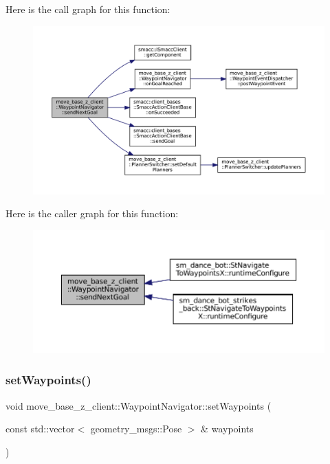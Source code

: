 Here is the call graph for this function\+:
\nopagebreak
\begin{figure}[H]
\begin{center}
\leavevmode
\includegraphics[width=350pt]{classmove__base__z__client_1_1WaypointNavigator_a376c1b5f822325122d29ad4f6e568b08_cgraph}
\end{center}
\end{figure}
Here is the caller graph for this function\+:
\nopagebreak
\begin{figure}[H]
\begin{center}
\leavevmode
\includegraphics[width=350pt]{classmove__base__z__client_1_1WaypointNavigator_a376c1b5f822325122d29ad4f6e568b08_icgraph}
\end{center}
\end{figure}
\mbox{\label{classmove__base__z__client_1_1WaypointNavigator_a2414712bd721461c810eb8908f57eef7}} 
\subsubsection{\texorpdfstring{set\+Waypoints()}{setWaypoints()}\hspace{0.1cm}{\footnotesize\ttfamily [1/2]}}
{\footnotesize\ttfamily void move\+\_\+base\+\_\+z\+\_\+client\+::\+Waypoint\+Navigator\+::set\+Waypoints (\begin{DoxyParamCaption}\item[{const std\+::vector$<$ geometry\+\_\+msgs\+::\+Pose $>$ \&}]{waypoints }\end{DoxyParamCaption})}



